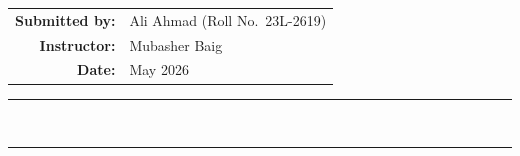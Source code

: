 \documentclass[12pt,a4paper]{article}
\begin{document}
\begin{titlepage}
\vspace{1.5cm}

{\centering
\begin{tabular}{rl}
  \textbf{Submitted by:} & Ali Ahmad \quad (Roll No.\ 23L-2619)\\[4pt]
  \textbf{Instructor:}   & Mubasher Baig\\[4pt]
  \textbf{Date:}         & May 2026\\
\end{tabular}
\par}

\vfill
\noindent\textcolor{accentteal}{\rule{\linewidth}{1pt}}

\end{titlepage}

\clearpage
{}
\setcounter{page}{2}
\thispagestyle{plain}

\\[-4pt]
\noindent\textcolor{accentteal}{\rule{\textwidth}{1.2pt}}
\vspace{4pt}
\end{document}

